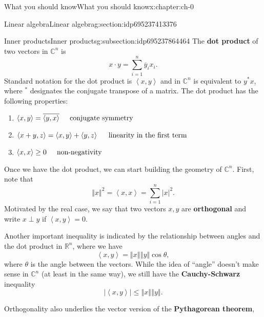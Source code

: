 \documentclass[oneside,10pt,]{book}
\newcommand{\terminology}[1]{\textbf{#1}}
\numberwithin{equation}{section}
\newcommand{\C}{\mathbb{C}}
\newcommand{\R}{\mathbb{R}}
\newcommand{\cc}[1]{\overline{#1}}
\newcommand{\abs}[1]{\left\vert#1\right\vert}
\newcommand{\norm}[1]{\left\Vert#1\right\Vert}
\newcommand{\ip}[2]{\left\langle #1, #2 \right\rangle}
\newcommand{\ad}{^\ast}
\numberwithin{equation}{section}
\begin{document}
\begin{chapterptx}{What you should know}{}{What you should know}{}{}{x:chapter:ch-0}
\begin{sectionptx}{Linear algebra}{}{Linear algebra}{}{}{g:section:idp695237413376}
\typeout{************************************************}
%
\begin{subsectionptx}{Inner products}{}{Inner products}{}{}{g:subsection:idp695237864464}
The \terminology{dot product} of two vectors in \(\C^n\) is%
\begin{equation}
x \cdot y = \sum_{i=1}^n \cc y_i x_i.\label{x:men:def-dot}
\end{equation}
Standard notation for the dot product is \(\ip{x}{y}\) and in \(\C^n\) is equivalent to \(y\ad x\), where \(\ad\) designates the conjugate transpose of a matrix. The dot product has the following properties:%
\begin{enumerate}
\item{}\(\displaystyle \ip{x}{y} = \cc{\ip{y}{x}} \hspace{.2in} \text{conjugate symmetry}\)%
\item{}\(\displaystyle \ip{x + y}{z} = \ip{x}{y} + \ip{y}{z} \hspace{.2in} \text{linearity in the first term}\)%
\item{}\(\displaystyle \ip{x}{x} \geq 0 \hspace{.2in} \text{non-negativity}\)%
\end{enumerate}
%
\par
Once we have the dot product, we can start building the geometry of \(\C^n\). First, note that%
\begin{equation}
\norm{x}^2 = \ip{x}{x} = \sum_{i=1}^n \abs{x}^2.\label{x:men:eq-Euclidean-norm}
\end{equation}
Motivated by the real case, we say that two vectors \(x, y\) are \terminology{orthogonal} and write \(x \perp y\) if \(\ip{x}{y} = 0\).%
\par
Another important inequality is indicated by the relationship between angles and the dot product in \(\R^n\), where we have%
\begin{equation*}
\ip{x}{y} = \norm{x}\norm{y}\cos \theta,
\end{equation*}
where \(\theta\) is the angle between the vectors. While the idea of ``angle'' doesn't make sense in \(\C^n\) (at least in the same way), we still have the \terminology{Cauchy-Schwarz} inequality%
\begin{equation}
\abs{\ip{x}{y}} \leq \norm{x}\norm{y}.\label{g:men:idp695237878192}
\end{equation}
%
\par
Orthogonality also underlies the vector version of the \terminology{Pythagorean theorem},%
\begin{equation}

\end{equation}
\end{subsectionptx}
\end{sectionptx}
\end{chapterptx}
\end{document}
